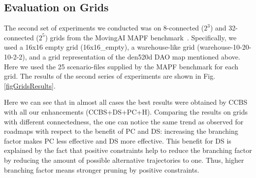 \documentclass[letterpaper]{article} %
\newcommand{\ccbs}{\ac{CCBS}\xspace}
\newcommand{\mapf}{\ac{MAPF}\xspace}
\newcommand{\pc}{\ac{PC}\xspace}
\newcommand{\ds}{\ac{DS}\xspace}
\begin{document}
\subsection{Evaluation on Grids}

The second set of experiments we conducted was on 8-connected ($2^3$) and 32-connected ($2^5$) grids from the MovingAI \mapf benchmark~\cite{stern2019multi}.
Specifically, we used a 16x16 empty grid (16x16\_empty), a warehouse-like grid (warehouse-10-20-10-2-2), and a grid representation of the den520d DAO map mentioned above.
Here we used the 25 scenario-files supplied by the \mapf benchmark for each grid.
The results of the second series of experiments are shown in Fig.\ref{figGridsResults}.


Here we can see that in almost all cases %
the best results were obtained by \ccbs with all our enhancements (\ccbs+\ds+\pc+H).
Comparing the results on grids with different connectedness, the one can notice the same trend as observed for roadmaps with respect to the benefit of \pc and \ds: increasing the branching factor makes \pc less effective and \ds more effective. %
This benefit for \ds is explained by the fact that positive constraints help to reduce the branching factor by reducing the amount of possible alternative trajectories to one. Thus, higher branching factor means stronger pruning by positive constraints.


\end{document}
